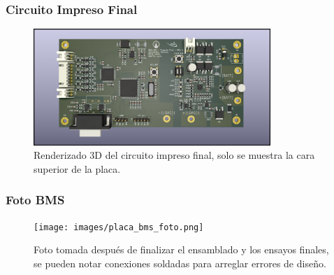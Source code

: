 \documentclass[10pt]{beamer}
\theoremstyle{remark}
\theoremstyle{definition}
\begin{document}
\begin{frame}
    \frametitle{Circuito Impreso Final}

    \begin{figure}[h!]
        \begin{center}
            \includegraphics[width=0.8\textwidth]{images/render_pcb.png}
            \caption{Renderizado 3D del circuito impreso final, solo se muestra la
            cara superior de la placa.}
            \label{render_pcb}
        \end{center}
    \end{figure}
\end{frame}

\begin{frame}
    \frametitle{Foto BMS}
    \begin{figure}[h!]
        \begin{center}
            \texttt{[image: images/placa\_bms\_foto.png]}
            \caption{Foto tomada despu\'es de finalizar el ensamblado y los ensayos
                finales, se pueden notar conexiones soldadas para arreglar errores de
            diseño.}
            \label{placa_bms_fotografia}
        \end{center}
    \end{figure}
\end{frame}
\end{document}
